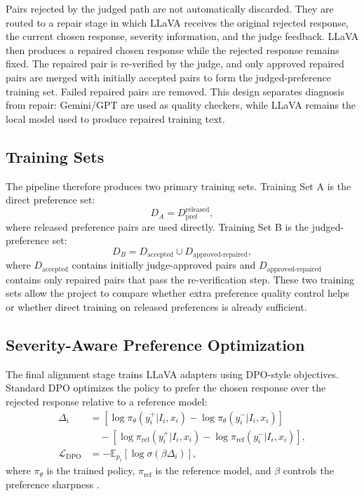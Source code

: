 \documentclass{article}
\begin{document}
Pairs rejected by the judged path are not automatically discarded. They are routed to a repair stage in which LLaVA receives the original rejected response, the current chosen response, severity information, and the judge feedback. LLaVA then produces a repaired chosen response while the rejected response remains fixed. The repaired pair is re-verified by the judge, and only approved repaired pairs are merged with initially accepted pairs to form the judged-preference training set. Failed repaired pairs are removed. This design separates diagnosis from repair: Gemini/GPT are used as quality checkers, while LLaVA remains the local model used to produce repaired training text.

\subsection{Training Sets}

The pipeline therefore produces two primary training sets. Training Set A is the direct preference set:
\begin{equation}
D_A = D_{\mathrm{pref}}^{\mathrm{released}},
\end{equation}
where released preference pairs are used directly. Training Set B is the judged-preference set:
\begin{equation}
D_B = D_{\mathrm{accepted}} \cup D_{\mathrm{approved}\text{-}\mathrm{repaired}},
\end{equation}
where $D_{\mathrm{accepted}}$ contains initially judge-approved pairs and $D_{\mathrm{approved}\text{-}\mathrm{repaired}}$ contains only repaired pairs that pass the re-verification step. These two training sets allow the project to compare whether extra preference quality control helps or whether direct training on released preferences is already sufficient.

\subsection{Severity-Aware Preference Optimization}

The final alignment stage trains LLaVA adapters using DPO-style objectives. Standard DPO optimizes the policy to prefer the chosen response over the rejected response relative to a reference model:
\begin{align}
\Delta_i &=
\left[\log \pi_\theta(y_i^+|I_i,x_i)-\log \pi_\theta(y_i^-|I_i,x_i)\right] \nonumber\\
&\quad -
\left[\log \pi_{\mathrm{ref}}(y_i^+|I_i,x_i)-\log \pi_{\mathrm{ref}}(y_i^-|I_i,x_i)\right], \\
\mathcal{L}_{\mathrm{DPO}} &=
-\mathbb{E}_{p_i}
\left[
\log \sigma\left(
\beta \Delta_i
\right)
\right],
\end{align}
where $\pi_\theta$ is the trained policy, $\pi_{\mathrm{ref}}$ is the reference model, and $\beta$ controls the preference sharpness \citep{rafailov2024dpo}.
\end{document}
